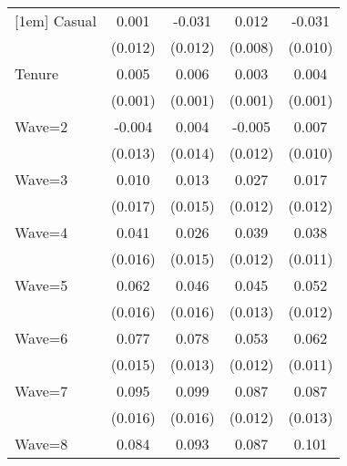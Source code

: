 {\begin{tabular}{l*{4}{c}}
[1em]
Casual              &       0.001         &      -0.031\sym{*}  &       0.012         &      -0.031\sym{**} \\
                    &     (0.012)         &     (0.012)         &     (0.008)         &     (0.010)         \\
[1em]
Tenure              &       0.005\sym{***}&       0.006\sym{***}&       0.003\sym{***}&       0.004\sym{***}\\
                    &     (0.001)         &     (0.001)         &     (0.001)         &     (0.001)         \\
[1em]
Wave=2              &      -0.004         &       0.004         &      -0.005         &       0.007         \\
                    &     (0.013)         &     (0.014)         &     (0.012)         &     (0.010)         \\
[1em]
Wave=3              &       0.010         &       0.013         &       0.027\sym{*}  &       0.017         \\
                    &     (0.017)         &     (0.015)         &     (0.012)         &     (0.012)         \\
[1em]
Wave=4              &       0.041\sym{**} &       0.026         &       0.039\sym{***}&       0.038\sym{***}\\
                    &     (0.016)         &     (0.015)         &     (0.012)         &     (0.011)         \\
[1em]
Wave=5              &       0.062\sym{***}&       0.046\sym{**} &       0.045\sym{***}&       0.052\sym{***}\\
                    &     (0.016)         &     (0.016)         &     (0.013)         &     (0.012)         \\
[1em]
Wave=6              &       0.077\sym{***}&       0.078\sym{***}&       0.053\sym{***}&       0.062\sym{***}\\
                    &     (0.015)         &     (0.013)         &     (0.012)         &     (0.011)         \\
[1em]
Wave=7              &       0.095\sym{***}&       0.099\sym{***}&       0.087\sym{***}&       0.087\sym{***}\\
                    &     (0.016)         &     (0.016)         &     (0.012)         &     (0.013)         \\
[1em]
Wave=8              &       0.084\sym{***}&       0.093\sym{***}&       0.087\sym{***}&       0.101\sym{***}\\

\end{tabular}}
